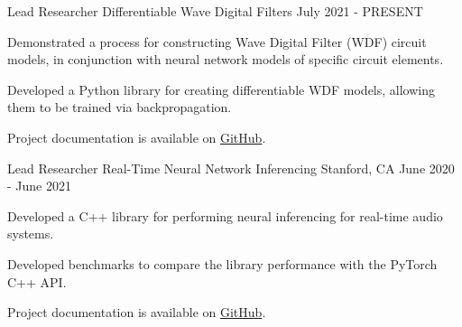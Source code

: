 
\begin{cventries}

  \cventry
    {Lead Researcher} %
    {Differentiable Wave Digital Filters} %
    {} %
    {July 2021 - PRESENT} %
    {
      \begin{cvitems} %
        \item {Demonstrated a process for constructing Wave Digital Filter (WDF) circuit models, in conjunction with neural network models of specific circuit elements.}
        \item {Developed a Python library for creating differentiable WDF models, allowing them to be trained via backpropagation.}
        \item {Project documentation is available on \href{https://github.com/jatinchowdhury18/differentiable-wdfs}{GitHub}.}
      \end{cvitems}
    }

  \cventry
    {Lead Researcher} %
    {Real-Time Neural Network Inferencing} %
    {Stanford, CA} %
    {June 2020 - June 2021} %
    {
      \begin{cvitems} %
        \item {Developed a C++ library for performing neural inferencing for real-time audio systems.}
        \item {Developed benchmarks to compare the library performance with the PyTorch C++ API.}
        \item {Project documentation is available on \href{https://github.com/jatinchowdhury18/RTNeural}{GitHub}.}
      \end{cvitems}
    }


\end{cventries}
